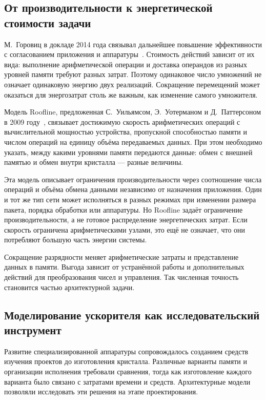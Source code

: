 \subsection{От производительности к энергетической стоимости задачи}

М.~Горовиц в докладе 2014 года связывал дальнейшее повышение
эффективности с согласованием приложения и аппаратуры~\cite{horowitz2014}.
Стоимость действий зависит от их вида: выполнение арифметической
операции и доставка операндов из разных уровней памяти требуют
разных затрат. Поэтому одинаковое число умножений не означает одинаковую
энергию двух реализаций. Сокращение перемещений может оказаться
для энергозатрат столь же важным, как изменение самого умножителя.

Модель Roofline, предложенная С.~Уильямсом, Э.~Уотерманом
и Д.~Паттерсоном в 2009 году~\cite{roofline2009}, связывает достижимую скорость
арифметических операций с вычислительной мощностью устройства,
пропускной способностью памяти и числом операций на единицу объёма
передаваемых данных. При этом необходимо указать, между какими уровнями памяти передаются данные:
обмен с внешней памятью и обмен внутри кристалла — разные величины.

Эта модель описывает ограничения производительности через соотношение числа
операций и объёма обмена данными независимо от назначения приложения. Один и тот же тип сети
может исполняться в разных режимах при изменении размера пакета,
порядка обработки или аппаратуры. Но Roofline задаёт ограничение
производительности, а не готовое распределение энергетических затрат.
Если скорость ограничена арифметическими узлами, это ещё не означает, что они
потребляют большую часть энергии системы.

Сокращение разрядности меняет арифметические затраты и представление
данных в памяти. Выгода зависит от устранённой работы и дополнительных
действий для преобразования чисел и управления. Так численная точность
становится частью архитектурной задачи.

\subsection{Моделирование ускорителя как исследовательский инструмент}

Развитие специализированной аппаратуры сопровождалось
созданием средств изучения проектов до изготовления кристалла.
Различные варианты памяти и организации исполнения требовали
сравнения, тогда как изготовление каждого варианта было
связано с затратами времени и средств. Архитектурные модели
позволяли исследовать эти решения на этапе проектирования.

